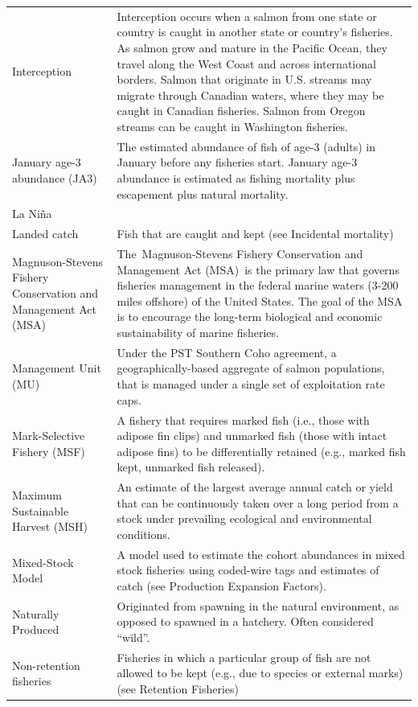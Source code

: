 \documentclass[
  letterpaper,
  DIV=11,
  numbers=noendperiod]{scrartcl}
\begin{document}
\begin{table}
\begin{tabular*}{\linewidth}{@{\extracolsep{\fill}}ll}
Interception & Interception occurs when a salmon from one state or country is caught in another state or country's fisheries. As salmon grow and mature in the Pacific Ocean, they travel along the West Coast and across international borders. Salmon that originate in U.S. streams may migrate through Canadian waters, where they may be caught in Canadian fisheries. Salmon from Oregon streams can be caught in Washington fisheries. \\ 
January age-3 abundance (JA3) & The estimated abundance of fish of age-3 (adults) in January before any fisheries start. January age-3 abundance is estimated as fishing mortality plus escapement plus natural mortality. \\ 
La Niña &  \\ 
Landed catch & Fish that are caught and kept (see Incidental mortality) \\ 
Magnuson-Stevens Fishery Conservation and Management Act (MSA) & The Magnuson-Stevens Fishery Conservation and Management Act (MSA) is the primary law that governs fisheries management in the federal marine waters (3-200 miles offshore) of the United States. The goal of the MSA is to encourage the long-term biological and economic sustainability of marine fisheries. \\ 
Management Unit (MU) & Under the PST Southern Coho agreement, a geographically-based aggregate of salmon populations, that is managed under a single set of exploitation rate caps. \\ 
Mark-Selective Fishery (MSF) & A fishery that requires marked fish (i.e., those with adipose fin clips) and unmarked fish (those with intact adipose fins) to be differentially retained (e.g., marked fish kept, unmarked fish released). \\ 
Maximum Sustainable Harvest (MSH) & An estimate of the largest average annual catch or yield that can be continuously taken over a long period from a stock under prevailing ecological and environmental conditions. \\ 
Mixed-Stock Model & A model used to estimate the cohort abundances in mixed stock fisheries using coded-wire tags and estimates of catch (see Production Expansion Factors). \\ 
Naturally Produced & Originated from spawning in the natural environment, as opposed to spawned in a hatchery. Often considered “wild”. \\ 
Non-retention fisheries & Fisheries in which a particular group of fish are not allowed to be kept (e.g., due to species or external marks) (see Retention Fisheries) \\ 

\end{tabular*}
\end{table}
\end{document}
